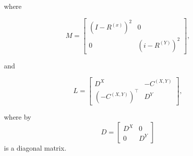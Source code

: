   where

  \[M=\begin{bmatrix}
        (I-R^{(x)})^2 & 0\\
        0 & (i-R^{(Y)})^2
      \end{bmatrix},\]

  and

  \[L=\begin{bmatrix}
        D^X & -C^{(X,Y)}\\
        (-C^{(X,Y)})^\intercal & D^Y
      \end{bmatrix},\]

  where by 
    \[D=\begin{bmatrix}
          D^X & 0\\
          0 & D^Y
        \end{bmatrix}\]
  is a diagonal matrix.
